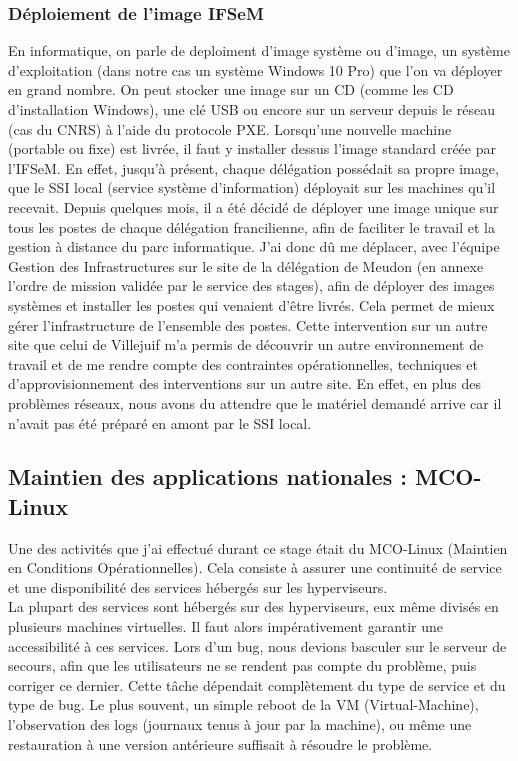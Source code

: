 \subsubsection{Déploiement de l'image IFSeM}
En informatique, on parle  de deploiment d'image système ou d'image, un système d'exploitation (dans notre cas un système Windows 10 Pro) que l'on va déployer en grand nombre. On peut stocker une image sur un CD (comme les CD d'installation Windows), une clé USB ou encore sur un serveur depuis le réseau (cas du CNRS) à l'aide du protocole PXE. 
\medbreak
Lorsqu'une nouvelle machine (portable ou fixe) est livrée, il faut y installer dessus l'image standard créée par l'IFSeM. En effet, jusqu'à présent, chaque délégation possédait sa propre image, que le SSI local (service système d'information) déployait sur les machines qu'il recevait. Depuis quelques mois, il a été décidé de déployer une image unique sur tous les postes de chaque délégation francilienne, afin de faciliter le travail et la gestion à distance du parc informatique.
\medbreak
J'ai donc dû me déplacer, avec l'équipe Gestion des Infrastructures sur le site de la délégation de Meudon (en annexe l'ordre de mission validée par le service des stages), afin de déployer des images systèmes et installer les postes qui venaient d'être livrés. Cela permet de mieux gérer l'infrastructure de l'ensemble des postes. Cette intervention sur un autre site que celui de Villejuif m'a permis de découvrir un autre environnement de travail et de me rendre compte des contraintes opérationnelles, techniques et d’approvisionnement des interventions sur un autre site. En effet, en plus des problèmes réseaux, nous avons du attendre que le matériel demandé arrive car il n'avait pas été préparé en amont par le SSI local. 

\subsection{Maintien des applications nationales : MCO-Linux}
Une des activités que j'ai effectué durant ce stage était du MCO-Linux (Maintien en Conditions Opérationnelles). Cela consiste à assurer une continuité de service et une disponibilité des services hébergés sur les hyperviseurs. \\
La plupart des services sont hébergés sur des hyperviseurs, eux même divisés en plusieurs machines virtuelles. Il faut alors impérativement garantir une accessibilité à ces services. Lors d'un bug, nous devions basculer sur le serveur de secours, afin que les utilisateurs ne se rendent pas compte du problème, puis corriger ce dernier. Cette tâche dépendait complètement du type de service et du type de bug. Le plus souvent, un simple reboot de la VM (Virtual-Machine), l'observation des logs (journaux tenus à jour par la machine), ou même une restauration à une version antérieure suffisait à résoudre le problème. 

